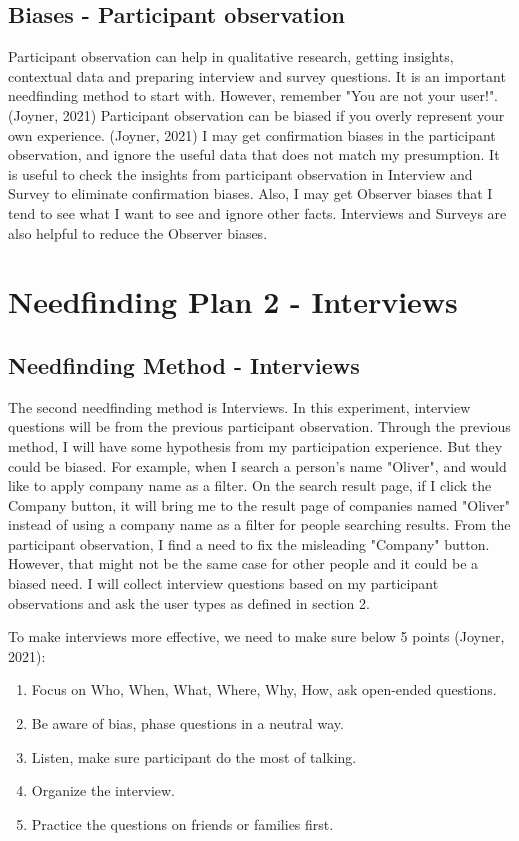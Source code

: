 \documentclass[
	letterpaper, %
]{jdf}
\begin{document}
\subsection{Biases - Participant observation}
Participant observation can help in qualitative research, getting insights, contextual data and preparing interview and survey questions. It is an important needfinding method to start with. However, remember "You are not your user!".(Joyner, 2021) Participant observation can be biased if you overly represent your own experience. (Joyner, 2021) I may get confirmation biases in the participant observation, and ignore the useful data that does not match my presumption. It is useful to check the insights from participant observation in Interview and Survey to eliminate confirmation biases. Also, I may get Observer biases that I tend to see what I want to see and ignore other facts. Interviews and Surveys are also helpful to reduce the Observer biases.

\section{Needfinding Plan 2 - Interviews}
\subsection{Needfinding Method - Interviews}
The second needfinding method is Interviews. In this experiment, interview questions will be from the previous participant observation. Through the previous method, I will have some hypothesis from my participation experience. But they could be biased. For example, when I search a person's name "Oliver", and would like to apply company name as a filter. On the search result page, if I click the Company button, it will bring me to the result page of companies named "Oliver" instead of using a company name as a filter for people searching results. From the participant observation, I find a need to fix the misleading "Company" button. However, that might not be the same case for other people and it could be a biased need. I will collect interview questions based on my participant observations and ask the user types as defined in section 2.

To make interviews more effective, we need to make sure below 5 points (Joyner, 2021):
\begin{enumerate}
	\item Focus on Who, When, What, Where, Why, How, ask open-ended questions.
	\item Be aware of bias, phase questions in a neutral way.
	\item Listen, make sure participant do the most of talking.
	\item Organize the interview.
	\item Practice the questions on friends or families first.
\end{enumerate}
\end{document}
